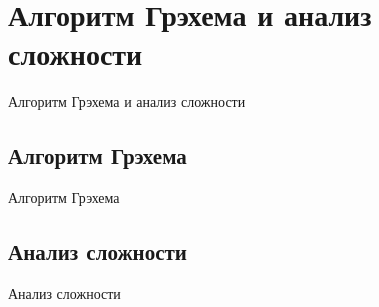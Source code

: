 \section{Алгоритм Грэхема и анализ сложности}
Алгоритм Грэхема и анализ сложности

\subsection{Алгоритм Грэхема}
Алгоритм Грэхема

\subsection{Анализ сложности}
Анализ сложности

\newpage
